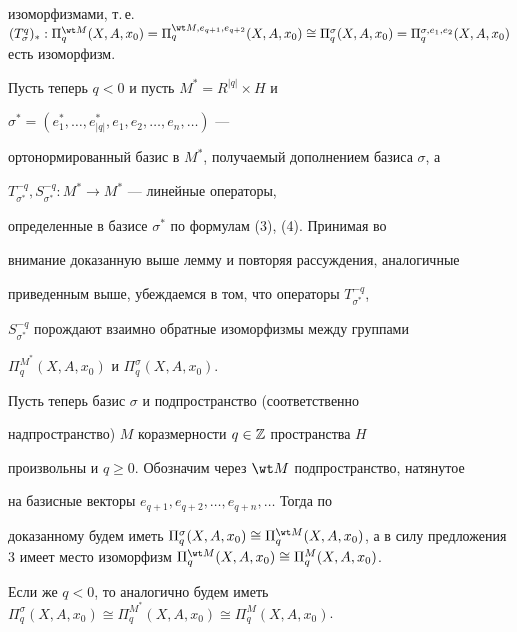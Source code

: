 \begin{pf}
изоморфизмами, т.\,е. $(T^q_\sigma)_*: \Pi^{\wt M}_q(X,A,x_0)= \Pi^{\wt 


M,e_{q+1},e_{q+2}}_q (X,A,x_0)\cong 


\Pi^\sigma_q(X,A,x_0)=\Pi^{\sigma,e_1,e_2}_q(X,A,x_0)$ есть изоморфизм. 


 


Пусть теперь $q<0$ и пусть $M^*=R^{|q|}\times H$ и 


$\sigma^*=(e^*_1,\dotsc,e^*_{|q|},e_1,e_2,\dotsc,e_n,\dotsc)$ --- 


ортонормированный базис в $M^*$, получаемый дополнением базиса $\sigma$, а 


$T^{-q}_{\sigma^*},S^{-q}_{\sigma^*}:M^*\to M^*$ --- линейные операторы, 


определенные в базисе $\sigma^*$ по формулам (3), (4). Принимая во 


внимание доказанную выше лемму и повторяя рассуждения, аналогичные 


приведенным выше, убеждаемся в том, что операторы $T^{-q}_{\sigma^*}$, 


$S^{-q}_{\sigma^*}$ порождают взаимно обратные изоморфизмы между группами 


$\Pi^{M^*}_q(X,A,x_0)$ и $\Pi^\sigma_q(X,A,x_0)$. 


 


Пусть теперь базис $\sigma$ и подпространство (соответственно 


надпространство) $M$ коразмерности $q\in\Bbb Z$ пространства $H$ 


произвольны и $q\ge0$. Обозначим через $\wt M$ подпространство, натянутое 


на базисные векторы $e_{q+1},e_{q+2},\dotsc,e_{q+n},\dotsc$ Тогда по 


доказанному будем иметь $\Pi^\sigma_q(X,A,x_0)\cong \Pi^{\wt 


M}_q(X,A,x_0)$, а в силу предложения 3 имеет место изоморфизм $\Pi^{\wt 


M}_q(X,A,x_0)\cong\Pi^M_q(X,A,x_0)$. 


 


Если же $q<0$, то аналогично будем иметь $\Pi^\sigma_q(X,A,x_0)\cong 


\Pi^{M^*}_q(X,A,x_0)\cong\Pi^M_q(X,A,x_0)$. 


\end{pf} 


